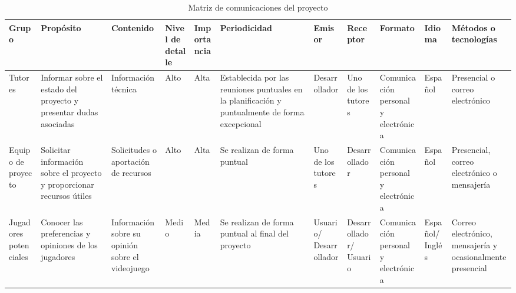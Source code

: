 \begin{landscape}
\clearpage

\begin{table}
	\begin{adjustwidth}{-3.2cm}{}
		{\scriptsize
			\begin{tabular}{|p{1.3cm}|p{2.0cm}|p{2.0cm}|p{1.1cm}|p{1.6cm}|p{2.5cm}|p{1.7cm}|p{1.7cm}|p{1.7cm}|p{1.2cm}|p{1.5cm}|}
				
				\hline
				\textbf{Grupo} & \textbf{Propósito} & \textbf{Contenido} & \textbf{Nivel de detalle} & \textbf{Importancia} & \textbf{Periodicidad} & \textbf{Emisor} & \textbf{Receptor} & \textbf{Formato} & \textbf{Idioma} & \textbf{Métodos o tecnologías}\\
				
				\hline
				Tutores & Informar sobre el estado del proyecto y presentar dudas asociadas & Información técnica & Alto & Alta & Establecida por las reuniones puntuales en la planificación y puntualmente de forma excepcional & Desarrollador & Uno de los tutores & Comunicación personal y electrónica & Español & Presencial o correo electrónico\\
				
				\hline
				Equipo de proyecto & Solicitar información sobre el proyecto y proporcionar recursos útiles & Solicitudes o aportación de recursos & Alto & Alta & Se realizan de forma puntual & Uno de los tutores & Desarrollador & Comunicación personal y electrónica & Español & Presencial, correo electrónico o mensajería\\
				
				\hline
				Jugadores potenciales & Conocer las preferencias y opiniones de los jugadores & Información sobre su opinión sobre el videojuego & Medio & Media & Se realizan de forma puntual al final del proyecto & Usuario/ Desarrollador & Desarrollador/ Usuario & Comunicación personal y electrónica  & Español/ Inglés & Correo electrónico, mensajería y ocasionalmente presencial \\
				
				\hline
				
			\end{tabular}
		}
	\end{adjustwidth}
		\caption{Matriz de comunicaciones del proyecto}
		\label{tab:comunicacion}
\end{table}


\end{landscape}

